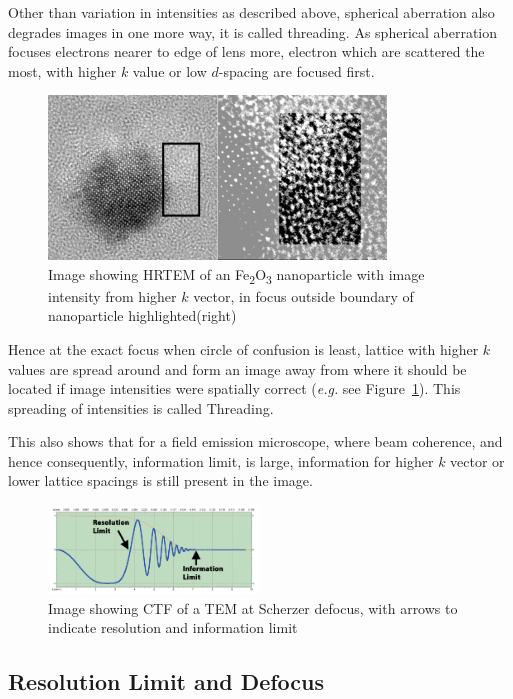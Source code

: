 Other than variation in intensities as described above, spherical aberration also degrades images in one more way, it is called threading.
As spherical aberration focuses electrons nearer to edge of lens more, electron which are scattered the most, with higher $k$ value or low $d$-spacing are focused first.
\begin{figure}
    \centering
    \includegraphics[width=0.8\textwidth]{figures/threading2.pdf}
    \caption{Image showing HRTEM of an Fe\textsubscript{2}O\textsubscript{3} nanoparticle with image intensity from higher $k$ vector, in focus outside boundary of nanoparticle highlighted(right)}
    \label{fig:fe2o3}
\end{figure}
Hence at the exact focus when circle of confusion is least, lattice with higher $k$ values are spread around and form an image away from where it should be located if image intensities were spatially correct (\textit{e.g.} see Figure~\ref{fig:fe2o3}).
This spreading of intensities is called Threading.

This also shows that for a field emission microscope, where beam coherence, and hence consequently, information limit, is large, information for higher $k$ vector or lower lattice spacings is still present in the image.


\begin{figure}
    \centering
        \includegraphics[width=0.5\textwidth]{figures/scherzer.pdf}
        \caption{Image showing CTF of a TEM at Scherzer defocus, with arrows to indicate resolution and information limit}
        \label{fig:ctfsherz}
\end{figure}


\subsection{Resolution Limit and Defocus} 

